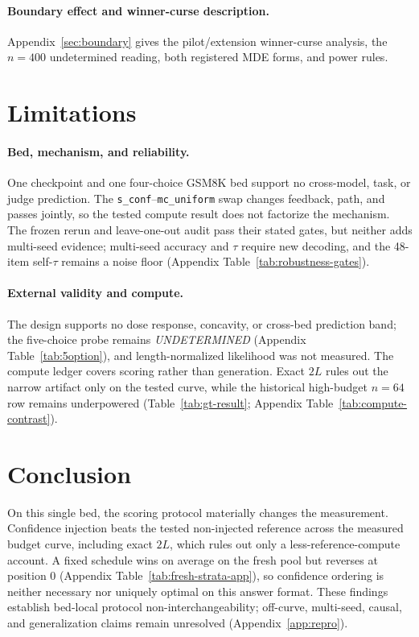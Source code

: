 \documentclass{article}
\newcommand{\sconf}{\texttt{s\_conf}}
\newcommand{\mcu}{\texttt{mc\_uniform}}
\begin{document}
\paragraph{Boundary effect and winner-curse description.}
Appendix~\ref{sec:boundary} gives the pilot/extension winner-curse analysis,
the $n{=}400$ undetermined reading, both registered MDE forms, and power rules.
\section{Limitations}
\label{sec:limitations}

\paragraph{Bed, mechanism, and reliability.}
One checkpoint and one four-choice GSM8K bed support no cross-model, task, or
judge prediction.  The \sconf{}--\mcu{} swap changes feedback, path, and passes
jointly, so the tested compute result does not factorize the mechanism.  The
frozen rerun and leave-one-out audit pass their stated gates, but neither adds
multi-seed evidence; multi-seed accuracy and $\tau$ require new decoding, and
the 48-item self-$\tau$ remains a noise floor (Appendix
Table~\ref{tab:robustness-gates}).

\paragraph{External validity and compute.}
The design supports no dose response, concavity, or cross-bed prediction band;
the five-choice probe remains \emph{UNDETERMINED} (Appendix
Table~\ref{tab:5option}), and length-normalized likelihood was not measured.
The compute ledger covers scoring rather than generation.  Exact $2L$ rules out
the narrow artifact only on the tested curve, while the historical high-budget
$n=64$ row remains underpowered (Table~\ref{tab:gt-result}; Appendix
Table~\ref{tab:compute-contrast}).

\section{Conclusion}
On this single bed, the scoring protocol materially changes the measurement.
Confidence injection beats the tested non-injected reference across the
measured budget curve, including exact $2L$, which rules out only a
less-reference-compute account.  A fixed schedule wins on average on the fresh
pool but reverses at position 0 (Appendix Table~\ref{tab:fresh-strata-app}), so confidence
ordering is neither necessary nor uniquely optimal on this answer format.
These findings establish bed-local protocol non-interchangeability; off-curve,
multi-seed, causal, and generalization claims remain unresolved
(Appendix~\ref{app:repro}).

\label{p5:main-text-end}



\appendix
\raggedbottom

\end{document}
